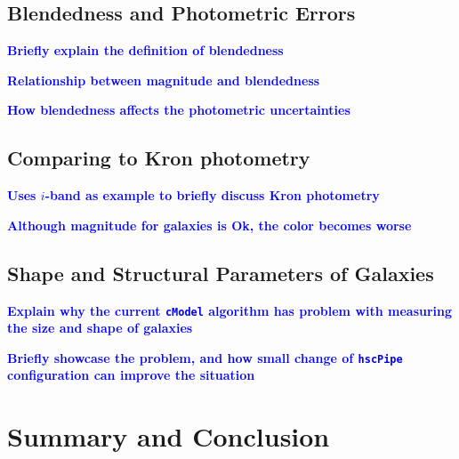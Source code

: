 \documentclass[useamsfonts]{pasj01}
\def\hscpipe{\texttt{hscPipe}}
\def\cmodel{\texttt{cModel}}
\newcommand{\plan}[1]{\textcolor{blue} {\textbf{#1}}}
\begin{document}
\subsection{Blendedness and Photometric Errors}
    \label{ssec:blendedness}

    \plan{Briefly explain the definition of blendedness}
    
    \plan{Relationship between magnitude and blendedness}
    
    \plan{How blendedness affects the photometric uncertainties}

\subsection{Comparing to Kron photometry}

    \plan{Uses $i$-band as example to briefly discuss Kron photometry}
    
    \plan{Although magnitude for galaxies is Ok, the color becomes worse}

\subsection{Shape and Structural Parameters of Galaxies}
    \label{ssec:shape}

    \plan{Explain why the current \cmodel{}{} algorithm has problem with measuring 
          the size and shape of galaxies}
          
    \plan{Briefly showcase the problem, and how small change of \hscpipe{} 
          configuration can improve the situation}

\section{Summary and Conclusion}
    \label{sec:summary}
\end{document}
